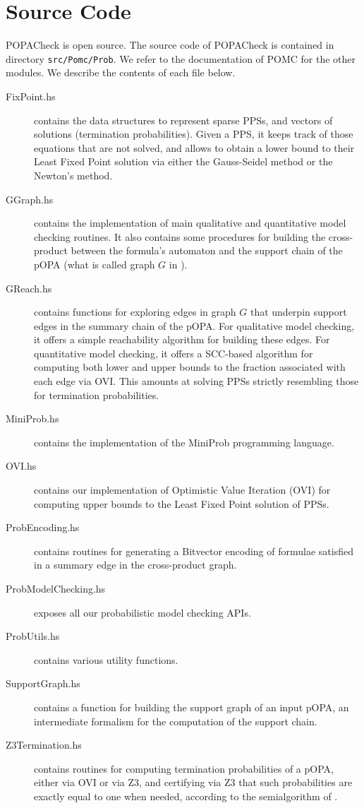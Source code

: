 \documentclass[9pt,a4paper]{article}
\begin{document}
\section{Source Code}
\label{sec:sources}
POPACheck is open source. The source code of POPACheck is contained in directory \texttt{src/Pomc/Prob}. We refer to the documentation of POMC for the other modules.
We describe the contents of each file below.
\begin{description}
\item[FixPoint.hs] contains the data structures to represent sparse PPSs, and vectors of solutions (termination probabilities). Given a PPS, it keeps track of those equations that are not solved, and allows to obtain a lower bound to their Least Fixed Point solution via either the Gauss-Seidel method or the Newton's method.
\item[GGraph.hs]  contains the implementation of main qualitative and quantitative model checking routines. It also contains some procedures for building the cross-product between the formula's automaton and the support chain of the pOPA (what is called graph $G$ in \cite{abs-2404-03515}).
\item[GReach.hs] contains functions for exploring edges in graph $G$ that underpin support edges in the summary chain of the pOPA. For qualitative model checking, it offers a simple reachability algorithm for building these edges. For quantitative model checking, it offers a SCC-based algorithm for computing both lower and upper bounds to the fraction associated with each edge via OVI. This amounts at solving PPSs strictly resembling those for termination probabilities.
\item[MiniProb.hs] contains the implementation of the MiniProb programming language.
\item[OVI.hs] contains our implementation of Optimistic Value Iteration (OVI) for computing upper bounds to the Least Fixed Point solution of PPSs.
\item[ProbEncoding.hs] contains routines for generating a Bitvector encoding of formulae satisfied in a summary edge in the cross-product graph.
\item[ProbModelChecking.hs] exposes all our probabilistic model checking APIs.
\item[ProbUtils.hs] contains various utility functions.
\item[SupportGraph.hs] contains a function for building the support graph of an input pOPA, an intermediate formalism for the computation of the support chain. 
\item[Z3Termination.hs] contains routines for computing termination probabilities of a pOPA, either via OVI or via Z3, and certifying via Z3 that such probabilities are exactly equal to one when needed, according to the semialgorithm of \cite{POPACheck}. 

\end{description}
\end{document}
